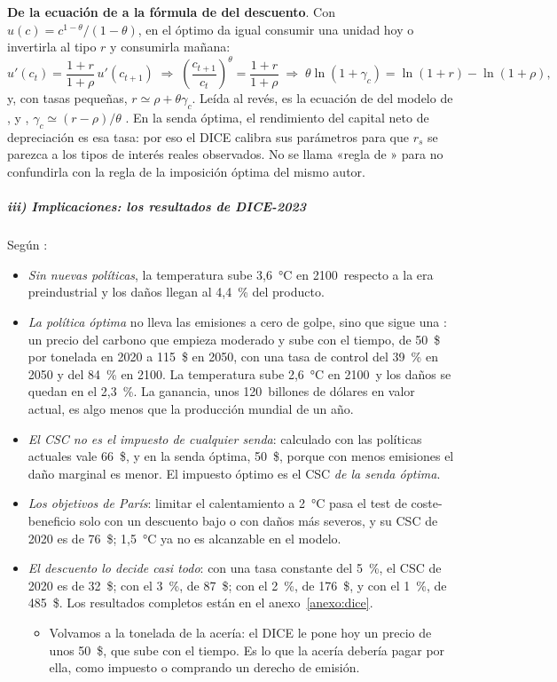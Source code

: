 \documentclass[11pt]{article}
\begin{document}
\begin{anotaciones}
\textbf{De la ecuación de  a la fórmula de  del descuento}. Con $u(c)=c^{1-\theta}/(1-\theta)$, en el óptimo da igual consumir una unidad hoy o invertirla al tipo $r$ y consumirla mañana:
\[
u'(c_t)=\frac{1+r}{1+\rho}\,u'(c_{t+1})\;\Longrightarrow\;\left(\frac{c_{t+1}}{c_t}\right)^{\theta}=\frac{1+r}{1+\rho}\;\Longrightarrow\;\theta\ln(1+\gamma_c)=\ln(1+r)-\ln(1+\rho),
\]
y, con tasas pequeñas, $r\simeq\rho+\theta\gamma_c$. Leída al revés, es la ecuación de  del modelo de ,  y , $\gamma_c\simeq(r-\rho)/\theta$ . En la senda óptima, el rendimiento del capital neto de depreciación es esa tasa: por eso el DICE calibra sus parámetros para que $r_s$ se parezca a los tipos de interés reales observados. No se llama «regla de » para no confundirla con la regla de la imposición óptima del mismo autor.
\end{anotaciones}

\subparagraph{iii) Implicaciones: los resultados de DICE-2023}

Según \textcite{BarrageNordhaus2024DICE}:
\begin{itemize}
\item \emph{Sin nuevas políticas}, la temperatura sube 3,6~°C en 2100~respecto a la era preindustrial y los daños llegan al 4,4~\% del producto.
\item \emph{La política óptima} no lleva las emisiones a cero de golpe, sino que sigue una : un precio del carbono que empieza moderado y sube con el tiempo, de 50~\$ por tonelada en 2020 a 115~\$ en 2050, con una tasa de control del 39~\% en 2050 y del 84~\% en 2100. La temperatura sube 2,6~°C en 2100~y los daños se quedan en el 2,3~\%. La ganancia, unos 120~billones de dólares en valor actual, es algo menos que la producción mundial de un año.
\item \emph{El CSC no es el impuesto de cualquier senda}: calculado con las políticas actuales vale 66~\$, y en la senda óptima, 50~\$, porque con menos emisiones el daño marginal es menor. El impuesto óptimo es el CSC \emph{de la senda óptima}.
\item \emph{Los objetivos de París}: limitar el calentamiento a 2~°C pasa el test de coste-beneficio solo con un descuento bajo o con daños más severos, y su CSC de 2020 es de 76~\$; 1,5~°C ya no es alcanzable en el modelo.
\item \emph{El descuento lo decide casi todo}: con una tasa constante del 5~\%, el CSC de 2020 es de 32~\$; con el 3~\%, de 87~\$; con el 2~\%, de 176~\$, y con el 1~\%, de 485~\$\nocite{BarrageNordhaus2024DICE}. Los resultados completos están en el anexo~\ref{anexo:dice}.
  \begin{itemize}
  \item Volvamos a la tonelada de la acería: el DICE le pone hoy un precio de unos 50~\$, que sube con el tiempo. Es lo que la acería debería pagar por ella, como impuesto o comprando un derecho de emisión.
  \end{itemize}
\end{itemize}
\end{document}
